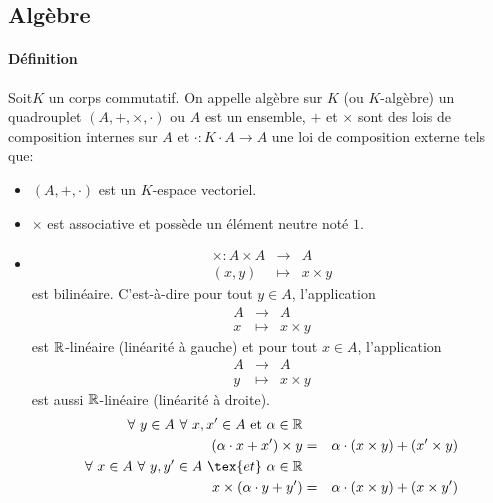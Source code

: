 %
\subsection{Algèbre}
%
\paragraph{Définition} Soit$K$ un corps commutatif. On appelle algèbre sur $K$ (ou $K$-algèbre) un quadrouplet $(A, +, \times, \cdot)$ ou $A$ est un ensemble, $+$ et $\times$ sont des lois de composition internes sur $A$ et $\cdot: K \cdot A \rightarrow A$ une loi de composition externe tels que:
\begin{itemize}
  \item $(A, +, \cdot)$ est un $K$-espace vectoriel.
  \item $\times$ est associative et possède un élément neutre noté $1$.
  \item 
    \begin{eqnarray*}
      \times: A \times A &\rightarrow& A \\
      (x, y) &\mapsto& x \times y
    \end{eqnarray*}
    est bilinéaire. C'est-à-dire pour tout $y \in A$, l'application
      \begin{eqnarray*}
        A &\rightarrow& A \\
        x &\mapsto& x \times y
      \end{eqnarray*}
      est $\mathbb{R}$-linéaire (linéarité à gauche) et pour tout $x \in A$, l'application
      \begin{eqnarray*}
        A &\rightarrow& A \\
        y &\mapsto& x \times y
      \end{eqnarray*}
      est aussi $\mathbb{R}$-linéaire (linéarité à droite).
      \begin{eqnarray*}
        \forall~ y \in A ~\forall~ x, x' \in A ~\text{et}~ \alpha \in \R \\
          (\alpha \cdot x + x') \times y &=& \alpha \cdot (x \times y) + (x' \times y) \\
        \forall~ x \in A ~\forall~ y, y' \in A ~\tex{et}~ \alpha \in \R \\
          x \times (\alpha \cdot y + y') &=& \alpha \cdot (x \times y) + (x \times y') \\
      \end{eqnarray*}
\end{itemize}

